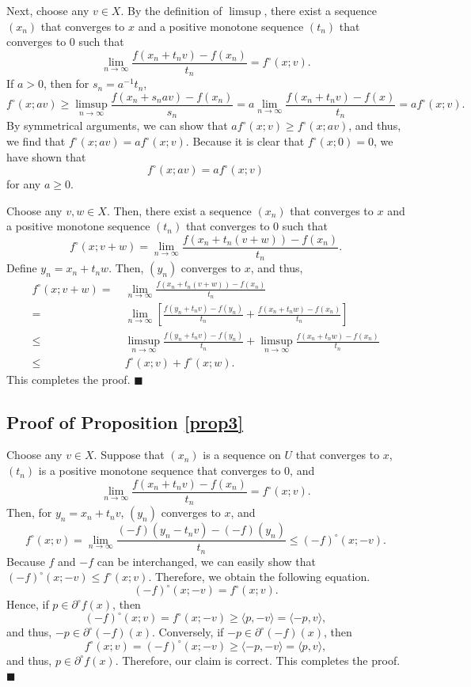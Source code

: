 \documentclass[a4paper,12pt]{article}
\theoremstyle{definition}
\begin{document}
Next, choose any $v\in X$. By the definition of $\limsup$, there exist a sequence $(x_n)$ that converges to $x$ and a positive monotone sequence $(t_n)$ that converges to $0$ such that
\[\lim_{n\to \infty}\frac{f(x_n+t_nv)-f(x_n)}{t_n}=f^{\circ}(x;v).\]
If $a>0$, then for $s_n=a^{-1}t_n$,
\[f^{\circ}(x;av)\ge \limsup_{n\to \infty}\frac{f(x_n+s_nav)-f(x_n)}{s_n}=a\lim_{n\to \infty}\frac{f(x_n+t_nv)-f(x)}{t_n}=af^{\circ}(x;v).\]
By symmetrical arguments, we can show that $af^{\circ}(x;v)\ge f^{\circ}(x;av)$, and thus, we find that $f^{\circ}(x;av)=af^{\circ}(x;v)$. Because it is clear that $f^{\circ}(x;0)=0$, we have shown that
\[f^{\circ}(x;av)=af^{\circ}(x;v)\]
for any $a\ge 0$.

Choose any $v,w\in X$. Then, there exist a sequence $(x_n)$ that converges to $x$ and a positive monotone sequence $(t_n)$ that converges to $0$ such that
\[f^{\circ}(x;v+w)=\lim_{n\to \infty}\frac{f(x_n+t_n(v+w))-f(x_n)}{t_n}.\]
Define $y_n=x_n+t_nw$. Then, $(y_n)$ converges to $x$, and thus,
\begin{align*}
f^{\circ}(x;v+w)=&~\lim_{n\to \infty}\frac{f(x_n+t_n(v+w))-f(x_n)}{t_n}\\
=&~\lim_{n\to \infty}\left[\frac{f(y_n+t_nv)-f(y_n)}{t_n}+\frac{f(x_n+t_nw)-f(x_n)}{t_n}\right]\\
\le&~\limsup_{n\to \infty}\frac{f(y_n+t_nv)-f(y_n)}{t_n}+\limsup_{n\to \infty}\frac{f(x_n+t_nw)-f(x_n)}{t_n}\\
\le&~f^{\circ}(x;v)+f^{\circ}(x;w).
\end{align*}
This completes the proof. $\blacksquare$


\subsection{Proof of Proposition \ref{prop3}}
Choose any $v\in X$. Suppose that $(x_n)$ is a sequence on $U$ that converges to $x$, $(t_n)$ is a positive monotone sequence that converges to $0$, and
\[\lim_{n\to \infty}\frac{f(x_n+t_nv)-f(x_n)}{t_n}=f^{\circ}(x;v).\]
Then, for $y_n=x_n+t_nv$, $(y_n)$ converges to $x$, and
\[f^{\circ}(x;v)=\lim_{n\to \infty}\frac{(-f)(y_n-t_nv)-(-f)(y_n)}{t_n}\le (-f)^{\circ}(x;-v).\]
Because $f$ and $-f$ can be interchanged, we can easily show that $(-f)^{\circ}(x;-v)\le f^{\circ}(x;v)$. Therefore, we obtain the following equation.
\[(-f)^{\circ}(x;-v)=f^{\circ}(x;v).\]
Hence, if $p\in \partial^{\circ}f(x)$, then
\[(-f)^{\circ}(x;v)=f^{\circ}(x;-v)\ge \langle p,-v\rangle=\langle -p,v\rangle,\]
and thus, $-p\in \partial^{\circ}(-f)(x)$. Conversely, if $-p\in \partial^{\circ}(-f)(x)$, then
\[f^{\circ}(x;v)=(-f)^{\circ}(x;-v)\ge \langle -p,-v\rangle=\langle p,v\rangle,\]
and thus, $p\in \partial^{\circ}f(x)$. Therefore, our claim is correct. This completes the proof. $\blacksquare$
\end{document}
